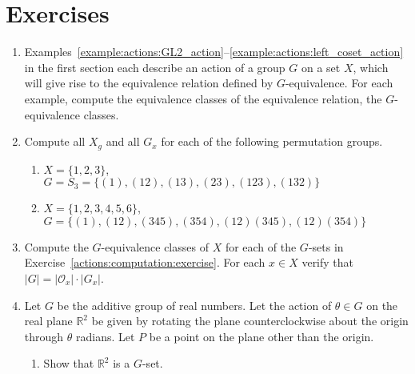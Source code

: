  
 
\section*{Exercises}
\exrule
 
 
 
 
{\small
\begin{enumerate}
 

\item
Examples~\ref{example:actions:GL2_action}--\ref{example:actions:left_coset_action}  in the first section each describe an action of a group $G$ on a set $X$, which will give rise to the equivalence relation defined by $G$-equivalence.  For each example, compute the equivalence classes of the equivalence relation,  the {\bfi $G$-equivalence classes\/}.
 
 
\item \label{actions:computation:exercise}
Compute all $X_g$ and all $G_x$ for each of the following permutation
groups. 
\begin{enumerate}
 
 \item
$X= \{1, 2, 3\}$, \\
$G=S_3=\{(1), (12), (13), (23), (123), (132)  \}$
 
 \item
$X = \{1, 2, 3, 4, 5, 6\}$, \\
$G = \{(1), (12), (345), (354), (12)(345), (12)(354)  \}$
 
\end{enumerate}
 
 
\item
Compute the $G$-equivalence classes of $X$ for each of the $G$-sets in
Exercise~\ref{actions:computation:exercise}. For each $x \in X$ verify that $|G|=|{\mathcal O}_x| \cdot
|G_x|$.  
 
 
\item
Let $G$ be the additive group of real numbers. Let the action of
$\theta \in G$ on the real plane ${\mathbb R}^2$ be given by rotating the
plane counterclockwise about the origin through $\theta$ radians. Let
$P$ be a point on the plane other than the origin.
\begin{enumerate}
 
 \item
Show that ${\mathbb R}^2$ is a $G$-set.
 

\end{enumerate}
\end{enumerate}}
